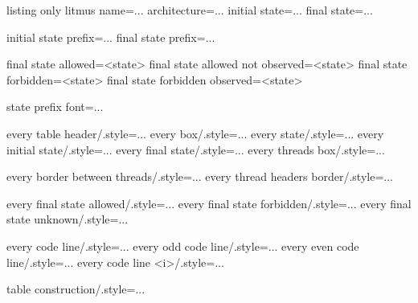 \documentclass[a4paper]{article}
\begin{document}
\begin{tcblisting}{listing only}
litmus name={...}   %
architecture={...}  %
initial state={...} %
final state={...}   %

initial state prefix={...}  %
final state prefix={...}    %

final state allowed={<state>}               %
final state allowed not observed={<state>}  %
final state forbidden={<state>}             %
final state forbidden observed={<state>}    %

state prefix font={...} %

every table header/.style={...}
every box/.style={...}
every state/.style={...}
every initial state/.style={...}
every final state/.style={...}
every threads box/.style={...}

every border between threads/.style={...}
every thread headers border/.style={...}

every final state allowed/.style={...}
every final state forbidden/.style={...}
every final state unknown/.style={...}

every code line/.style={...}
every odd code line/.style={...}
every even code line/.style={...}
every code line <i>/.style={...} %

table construction/.style={...}
\end{tcblisting}


\end{document}
